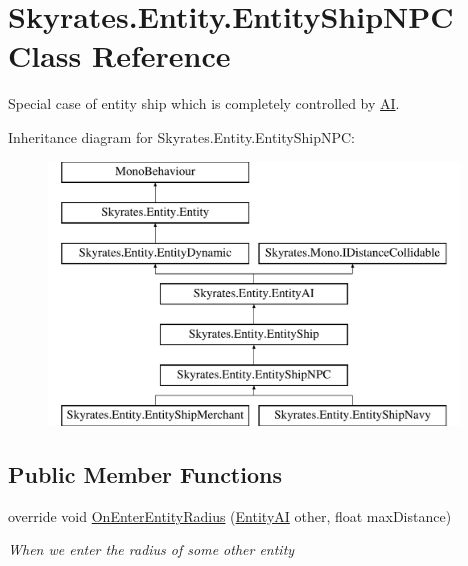 \hypertarget{class_skyrates_1_1_entity_1_1_entity_ship_n_p_c}{\section{Skyrates.\-Entity.\-Entity\-Ship\-N\-P\-C Class Reference}
\label{class_skyrates_1_1_entity_1_1_entity_ship_n_p_c}
}


Special case of entity ship which is completely controlled by \hyperlink{namespace_skyrates_1_1_a_i}{A\-I}.  


Inheritance diagram for Skyrates.\-Entity.\-Entity\-Ship\-N\-P\-C\-:\begin{figure}[H]
\begin{center}
\leavevmode
\includegraphics[height=7.000000cm]{class_skyrates_1_1_entity_1_1_entity_ship_n_p_c}
\end{center}
\end{figure}
\subsection*{Public Member Functions}
\begin{DoxyCompactItemize}
\item 
override void \hyperlink{class_skyrates_1_1_entity_1_1_entity_ship_n_p_c_ab4329cb50415633feb0d5d6ea191fe0d}{On\-Enter\-Entity\-Radius} (\hyperlink{class_skyrates_1_1_entity_1_1_entity_a_i}{Entity\-A\-I} other, float max\-Distance)
\begin{DoxyCompactList}\small\item\em When we enter the radius of some other entity \end{DoxyCompactList}\end{DoxyCompactItemize}
